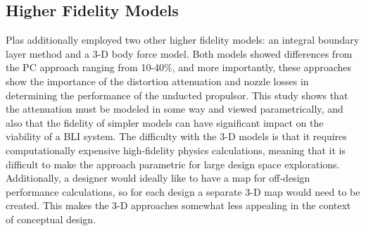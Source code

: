 \documentclass[12pt]{gatech-thesis}
\begin{document}
\subsection{Higher Fidelity Models}
\indent Plas additionally employed two other higher fidelity models:  an integral boundary layer method and a 3-D body force model.  Both models showed differences from the PC approach ranging from 10-40\%, and more importantly, these approaches show the importance of the distortion attenuation and nozzle losses in determining the performance of the unducted propulsor.  This study shows that the attenuation must be modeled in some way and viewed parametrically, and also that the fidelity of simpler models can have significant impact on the viability of a BLI system.  The difficulty with the 3-D models is that it requires computationally expensive high-fidelity physics calculations, meaning that it is difficult to make the approach parametric for large design space explorations.  Additionally, a designer would ideally like to have a map for off-design performance calculations, so for each design a separate 3-D map would need to be created.  This makes the 3-D approaches somewhat less appealing in the context of conceptual design.  
\end{document}
